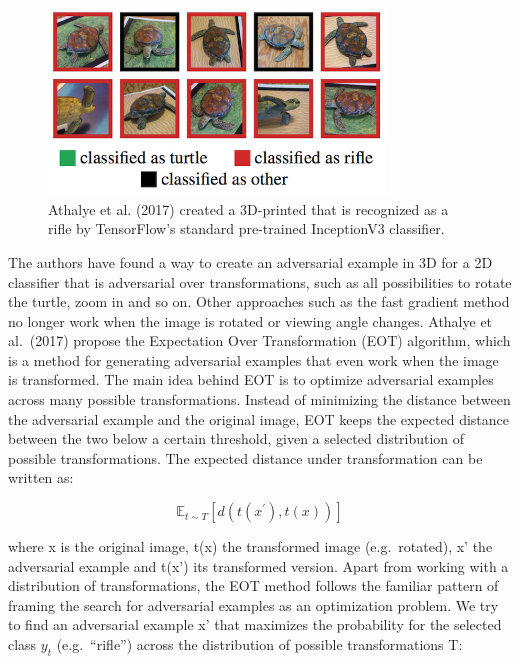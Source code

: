 \documentclass[
  10pt,
]{scrbook}
\begin{document}
\begin{figure}

{\centering \includegraphics[width=0.8\textwidth]{images/adversarial-turtle} 

}

\caption{Athalye et al. (2017) created a 3D-printed that is recognized as a rifle by TensorFlow’s standard pre-trained InceptionV3 classifier.}\label{fig:adversarial-turtle}
\end{figure}

The authors have found a way to create an adversarial example in 3D for a 2D classifier that is adversarial over transformations, such as all possibilities to rotate the turtle, zoom in and so on.
Other approaches such as the fast gradient method no longer work when the image is rotated or viewing angle changes.
Athalye et al.~(2017) propose the Expectation Over Transformation (EOT) algorithm, which is a method for generating adversarial examples that even work when the image is transformed.
The main idea behind EOT is to optimize adversarial examples across many possible transformations.
Instead of minimizing the distance between the adversarial example and the original image, EOT keeps the expected distance between the two below a certain threshold, given a selected distribution of possible transformations.
The expected distance under transformation can be written as:

\[\mathbb{E}_{t\sim{}T}[d(t(x^\prime),t(x))]\]

where x is the original image, t(x) the transformed image (e.g.~rotated), x' the adversarial example and t(x') its transformed version.
Apart from working with a distribution of transformations, the EOT method follows the familiar pattern of framing the search for adversarial examples as an optimization problem.
We try to find an adversarial example x' that maximizes the probability for the selected class \(y_t\) (e.g.~``rifle'') across the distribution of possible transformations T:
\end{document}
